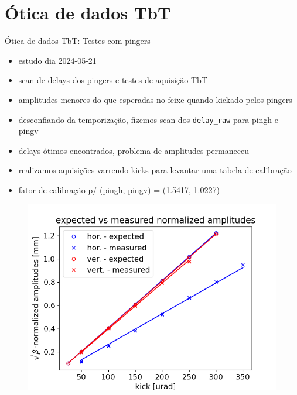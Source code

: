 \section{Ótica de dados TbT}



\begin{frame}{Ótica de dados TbT: Testes com pingers}

{\footnotesize
\begin{itemize}
    \item estudo dia 2024-05-21 \href{https://ais-eng-srv-ta.cnpem.br/Olog/index.html\#22749\_1}{}
    \item scan de delays dos pingers e testes de aquisição TbT
    \item amplitudes menores do que esperadas no feixe quando kickado pelos pingers
    \item desconfiando da temporização, fizemos scan dos \texttt{delay\_raw} para pingh e pingv
    \item delays ótimos encontrados, problema de amplitudes permaneceu
    \item realizamos aquisições varrendo kicks para levantar uma tabela de calibração 
    \item fator de calibração p/ (pingh, pingv) = (1.5417, 1.0227)
\end{itemize} 
}
\begin{figure}
    \centering
    \includegraphics[scale=0.35]{2024-06-21/figures/norm_amp_expected_vs_observed-210524.png}
\end{figure}
\end{frame}



